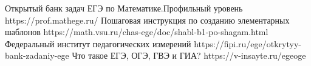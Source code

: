 \begin{thebibliography}{10}
    Открытый банк задач ЕГЭ по Математике.Профильный уровень https://prof.mathege.ru/
    Пошаговая инструкция по созданию элементарных шаблонов https://math.vsu.ru/chas-ege/doc/shabl-b1-po-shagam.html
    Федеральный институт педагогических измерений https://fipi.ru/ege/otkrytyy-bank-zadaniy-ege
     Что такое ЕГЭ, ОГЭ, ГВЭ и ГИА? https://v-insayte.ru/egeoge
    \end{thebibliography}